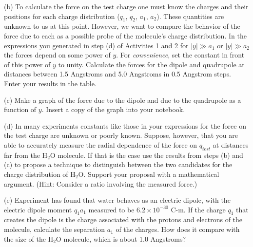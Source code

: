 (b) To calculate the force on the test charge one must know the charges
and their positions for each charge distribution ($q_1$, $q_2$, $a_1$, $a_2$). 
These quantities are unknown to us at
this point. However, we want to compare the behavior of the force
due to each as a possible probe of the molecule's charge distribution.
In the expressions you generated in step (d) of Activities 1 and 2
for $\left| y\right| \gg a_1$ or $\left| y\right| \gg  a_2$ the forces depend on some power of $y$. For
\emph{convenience}, set the constant in front of this power of $y$ to
unity. Calculate the forces for the dipole and quadrupole at distances
between 1.5 Angstroms and 5.0 Angstroms in 0.5 Angstrom steps. Enter
your results in the table.

(c) Make a graph of the force due to the dipole and due to the quadrupole
as a function of $y$. Insert a copy of the graph into your notebook.

(d) In many experiments constants like those in your expressions for
the force on the test charge are unknown or poorly known. Suppose,
however, that you are able to accurately measure the radial dependence
of the force on $q_{test}$ at distances far from the  H$_2$O
molecule. If that is the case use the results from steps (b) and (c)
to propose a technique to distinguish between the two candidates for
the charge distribution of  H$_2$O. Support your proposal with
a mathematical argument. (Hint: Consider a ratio involving the measured
force.)
\answerspace{25mm}

(e) Experiment has found that water behaves as an electric dipole,
with the electric dipole moment $q_1 a_1$ measured
to be $6.2 \times 10^{-30}$ C-m. If the charge $q_1$ that creates the dipole
is the charge associated with the protons and electrons
of the molecule, calculate the separation $a_1$ of the charges.
How does it compare with the size of the  H$_2$O molecule, which is
about 1.0 Angstroms?
\answerspace{15mm}

